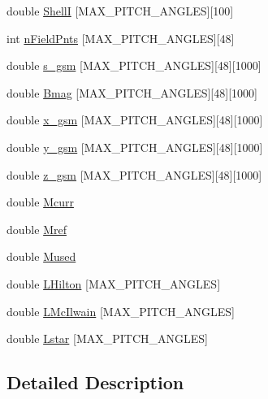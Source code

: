 \begin{CompactItemize}
\item 
double \hyperlink{struct_lgm___mag_ephem_info_9a29671c7d92f4a6fbbbf4caf6350b62}{ShellI} \mbox{[}MAX\_\-PITCH\_\-ANGLES\mbox{]}\mbox{[}100\mbox{]}
\item 
int \hyperlink{struct_lgm___mag_ephem_info_29cbea496fb314d5b004dd444cbe23a8}{nFieldPnts} \mbox{[}MAX\_\-PITCH\_\-ANGLES\mbox{]}\mbox{[}48\mbox{]}
\item 
double \hyperlink{struct_lgm___mag_ephem_info_fbd0f4250a5230950a688aa5fde2b8bc}{s\_\-gsm} \mbox{[}MAX\_\-PITCH\_\-ANGLES\mbox{]}\mbox{[}48\mbox{]}\mbox{[}1000\mbox{]}
\item 
double \hyperlink{struct_lgm___mag_ephem_info_8b01c6142170f19b03a8dc496b9a3678}{Bmag} \mbox{[}MAX\_\-PITCH\_\-ANGLES\mbox{]}\mbox{[}48\mbox{]}\mbox{[}1000\mbox{]}
\item 
double \hyperlink{struct_lgm___mag_ephem_info_59fdcbbc8f28e0dca963bdd893643827}{x\_\-gsm} \mbox{[}MAX\_\-PITCH\_\-ANGLES\mbox{]}\mbox{[}48\mbox{]}\mbox{[}1000\mbox{]}
\item 
double \hyperlink{struct_lgm___mag_ephem_info_2f086d0ae7b5e1afb9e95b5194ea3d84}{y\_\-gsm} \mbox{[}MAX\_\-PITCH\_\-ANGLES\mbox{]}\mbox{[}48\mbox{]}\mbox{[}1000\mbox{]}
\item 
double \hyperlink{struct_lgm___mag_ephem_info_604bb35325e4cdfd52be2d5d96fedc49}{z\_\-gsm} \mbox{[}MAX\_\-PITCH\_\-ANGLES\mbox{]}\mbox{[}48\mbox{]}\mbox{[}1000\mbox{]}
\item 
double \hyperlink{struct_lgm___mag_ephem_info_a63b377115bfe79515e2097f32738f8b}{Mcurr}
\item 
double \hyperlink{struct_lgm___mag_ephem_info_48f2de795abc764c809248272a03adbf}{Mref}
\item 
double \hyperlink{struct_lgm___mag_ephem_info_8cd747b5ee4d9da03a9ff039258c4df6}{Mused}
\item 
double \hyperlink{struct_lgm___mag_ephem_info_0c60b8e8cbed91a6659e978d407946c6}{LHilton} \mbox{[}MAX\_\-PITCH\_\-ANGLES\mbox{]}
\item 
double \hyperlink{struct_lgm___mag_ephem_info_ef38c562bbdfde054d2171e8183bac95}{LMcIlwain} \mbox{[}MAX\_\-PITCH\_\-ANGLES\mbox{]}
\item 
double \hyperlink{struct_lgm___mag_ephem_info_eb65115ebb3c6fc78a0250c76c345475}{Lstar} \mbox{[}MAX\_\-PITCH\_\-ANGLES\mbox{]}
\end{CompactItemize}


\subsection{Detailed Description}


